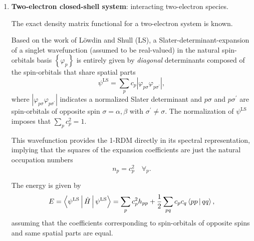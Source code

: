 \begin{enumerate}
    \item \textbf{Two-electron closed-shell system}: interacting two-electron
        species.

        The exact density matrix functional for a two-electron system is
        known.

        Based on the work of Löwdin and Shull (LS),
        a Slater-determinant-expansion of a singlet wavefunction (assumed to be
        real-valued) in the natural spin-orbitals basis $\left\{ \varphi_p \right\}$ 
        is entirely given by \textit{diagonal} determinants composed of the
        spin-orbitals that share spatial parts 
        \begin{equation}
            \psi^{\text{LS}} =
            \sum_{p} c_p \left| \varphi_{p \sigma} \varphi_{p \sigma^{\prime}} \right|
            ,
        \end{equation}
        where $\left| \varphi_{p \sigma} \varphi_{p \sigma^{\prime}} \right|$
        indicates a 
        normalized Slater determinant and $p \sigma$ and $p \sigma^{\prime}$ are
        spin-orbitals of opposite spin $\sigma = \alpha, \beta$ with 
        $\sigma^{\prime} \not= \sigma$.
        The normalization of $\psi^{\text{LS}}$ imposes
        that $\displaystyle\sum_{p} c_p^{2} = 1$.

        This wavefunction provides the 1-RDM directly in its spectral 
        representation, implying that the squares of the expansion 
        coefficients are just the natural occupation numbers
        \begin{equation}
            n_p = c_p^2\quad \forall_p
            .
        \end{equation}

        The energy is given by 
        \begin{equation}
            E = \Braket{\psi^{\text{LS}} | \hat{H} | \psi^{\text{LS}}} =
            \sum_{p} c_p^2 h_{pp} + \frac{1}{2} \sum_{pq} 
            c_p c_q \Braket{pp | qq}
            ,
        \end{equation}
        assuming that the coefficients corresponding to spin-orbitals of opposite
        spins and same spatial parts are equal.


\end{enumerate}
